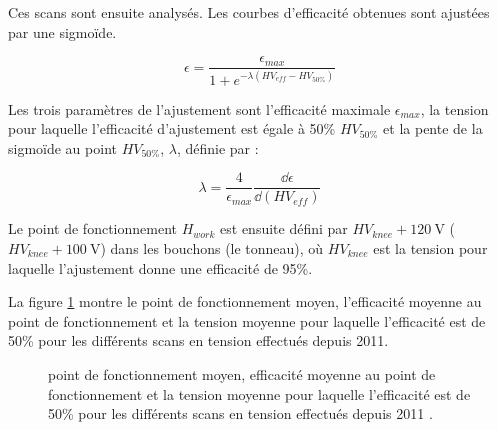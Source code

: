 Ces scans sont ensuite analysés. Les courbes d'efficacité obtenues sont ajustées par une sigmoïde.

\begin{equation}
\epsilon=\frac{\epsilon_{max}}{1+e^{-\lambda\left(HV_{eff}-HV_{50\%}\right)}}
\end{equation}

Les trois paramètres de l'ajustement sont l'efficacité maximale $\epsilon_{max}$, la tension pour laquelle l'efficacité d'ajustement est égale à \num{50}\% $HV_{50\%}$ et la pente de la sigmoïde au point $HV_{50\%}$, $\lambda$, définie par :

\begin{equation}
\lambda=\frac{4}{\epsilon_{max}}\frac{\dd \epsilon}{\dd \left(HV_{eff}\right)}
\end{equation}

Le point de fonctionnement $H_{work}$ est ensuite défini par $HV_{knee}+\SI{120}{\volt}$ ($HV_{knee}+\SI{100}{\volt}$) dans les bouchons (le tonneau), où $HV_{knee}$ est la tension pour laquelle l'ajustement donne une efficacité de \num{95}\%.

La figure \ref{working} montre le point de fonctionnement moyen, l'efficacité moyenne au point de fonctionnement et la tension moyenne pour laquelle l'efficacité est de \num{50}\% pour les différents scans en tension effectués depuis \num{2011}.
\vspace{0.5cm}
\begin{figure}[ht!]
	\centering
	\hfill
	\caption{point de fonctionnement moyen, efficacité moyenne au point de fonctionnement et la tension moyenne pour laquelle l'efficacité est de \num{50}\% pour les différents scans en tension effectués depuis \num{2011} \cite{working2}.}
	\label{working}
\end{figure}
\newpage

